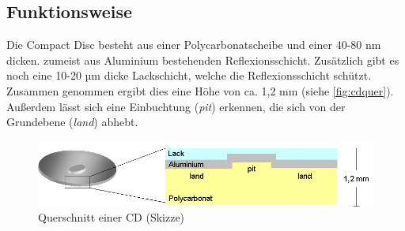 \subsection{Funktionsweise}
\label{subsec:cdfunktionsweise}

Die Compact Disc besteht aus einer Polycarbonatscheibe und einer 40-80 nm
dicken. zumeist aus Aluminium bestehenden Reflexionsschicht. Zusätzlich gibt es
noch eine 10-20 µm dicke Lackschicht, welche die Reflexionsschicht schützt.
Zusammen genommen ergibt dies eine Höhe von ca. 1,2 mm (siehe
\autoref{fig:cdquer}). Außerdem lässt sich eine Einbuchtung (\textit{pit})
erkennen, die sich von der Grundebene (\textit{land}) abhebt. \cite{cfcd}

\begin{figure}[h]
    \begin{center}
        \begin{minipage}[t]{\textwidth}
            \begin{center}
                \includegraphics[height=0.1\textheight]{Bilder/Optische_Datentraeger_Die_Compact_Disc/Funktionsweise/cdquer.png}
                \caption[Querschnitt einer CD (Skizze) \newline \url{http://daten.didaktikchemie.uni-bayreuth.de/umat/cd_dvd/cd-ausschnitt.gif} (zuletzt aufgerufen am 07.08.2015)]{Querschnitt einer CD (Skizze)}
                \label{fig:cdquer}
            \end{center}
        \end{minipage}
    \end{center}
\end{figure}

